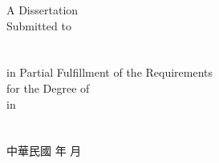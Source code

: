 \begin{center}
%
\vfill
\normalsize{A Dissertation}\\
\normalsize{Submitted to}
%
\normalsize{\fulldeptEname}\\
%
%
\ifx \collEname  \itsempty
\relax %
\else
\normalsize{\collEname}\\
\fi
%
\normalsize{\univEname}\\
%
\normalsize{in Partial Fulfillment of the Requirements}\\
%
\normalsize{for the Degree of}
%
\normalsize{\degreeEname}\\
%
\normalsize{in}\\
%
\normalsize{\deptEname}\\
%
\normalsize{\eMonth\ \eYear}\\
%
\normalsize{\ePlace}%
\vfill
\large{中華民國}%
\large{\cYear}%
\large{年}%
\large{\cMonth}%
\large{月}\\
\end{center}
\normalsize
\clearpage





























